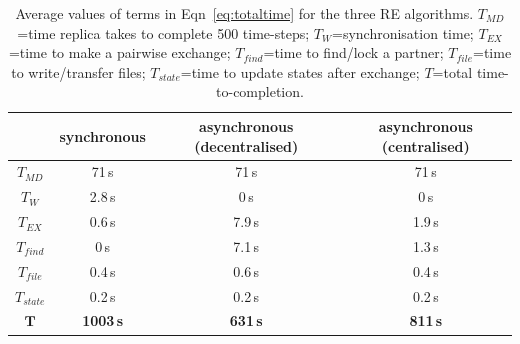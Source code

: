 \documentclass{rspublic}
\newcommand{\jhanote}[1]{ {\textcolor{red} { ***shantenu: #1 }}}
\newcommand{\athotanote}[1]{ {\textcolor{green} { ***athota: #1 }}}
\newcommand{\athotanote}[1]{}
\newcommand{\jhanote}[1]{}
\begin{document}

\begin{table}
    \centering
	\begin{tabular}{|c|c|c|c|}
	\hline
	                        &\textbf{synchronous}  &\textbf{asynchronous (decentralised)} 
	                        &\textbf{asynchronous (centralised)}\\
	\hline
	\hline
	$T_{MD}$       &71\,s &71\,s &71\,s\\
	\hline
	\hline
	$T_{W}$        &2.8\,s &0\,s &0\,s\\
	\hline\hline
	$T_{EX}$        &0.6\,s &7.9\,s &1.9\,s\\
	\hline
	\hspace{2mm}$T_{find}$        &0\,s   &7.1\,s &1.3\,s\\
	\hline
	\hspace{2mm}$T_{file}$       &0.4\,s &0.6\,s &0.4\,s\\
	\hline
    \hspace{2mm}$T_{state}$    &0.2\,s &0.2\,s  &0.2\,s\\
	\hline
	\hline
	$\mathbf{T}$        &\textbf{1003\,s} &\textbf{631\,s}    &\textbf{811\,s}\\
	\hline
    \end{tabular}
    \caption{Average values of terms in Eqn~\ref{eq:totaltime} for the three RE algorithms. $T_{MD}$=time replica takes to complete 500 time-steps; $T_W$=synchronisation time; $T_{EX}$=time to make a pairwise exchange; $T_{find}$=time to find/lock a partner; $T_{file}$=time to write/transfer files; $T_{state}$=time to update states after exchange; $T$=total time-to-completion.} 
	\label{table:repex_perf}
\end{table}
\end{document}
